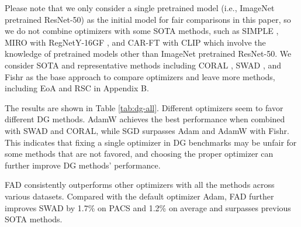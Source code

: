 Please note that we only consider a single pretrained model (i.e., ImageNet pretrained ResNet-50) as the initial model for fair comparisons in this paper, so we do not combine optimizers with some SOTA methods, such as SIMPLE \cite{lisimple}, MIRO \cite{cha2022domain} with RegNetY-16GF \cite{radosavovic2020designing}, and CAR-FT \cite{mao2022context} with CLIP \cite{radford2021learning} which involve the knowledge of pretrained models other than ImageNet pretrained ResNet-50. 
We consider SOTA and representative methods including CORAL \cite{CORAL16}, SWAD \cite{cha2021swad}, and Fishr \cite{rame2022fishr} as the base approach to compare optimizers and leave more methods, including EoA \cite{arpit2021ensemble} and RSC \cite{huang2020self} in Appendix B.  

The results are shown in Table \ref{tab:dg-all}. Different optimizers seem to favor different DG methods. AdamW achieves the best performance when combined with SWAD and CORAL, while SGD surpasses Adam and AdamW with Fishr. This indicates that fixing a single optimizer in DG benchmarks may be unfair for some methods that are not favored, and choosing the proper optimizer can further improve DG methods' performance. 

FAD consistently outperforms other optimizers with all the methods across various datasets. Compared with the default optimizer Adam, FAD further improves SWAD by 1.7\% on PACS and 1.2\% on average and surpasses previous SOTA methods.





